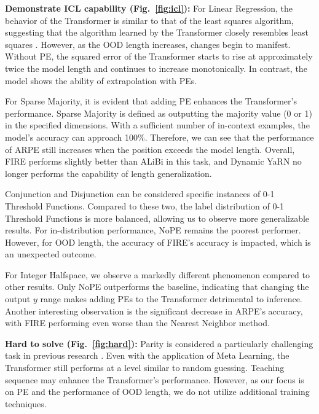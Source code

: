 \documentclass[letterpaper]{article} %
\begin{document}
\textbf{Demonstrate ICL capability (Fig.~\ref{fig:icl}):} For Linear Regression, the behavior of the Transformer is similar to that of the least squares algorithm, suggesting that the algorithm learned by the Transformer closely resembles least squares \cite{akyurek-2023-what}. However, as the OOD length increases, changes begin to manifest. Without PE, the squared error of the Transformer starts to rise at approximately twice the model length and continues to increase monotonically. In contrast, the model shows the ability of extrapolation with PEs.

For Sparse Majority, it is evident that adding PE enhances the Transformer's performance. Sparse Majority is defined as outputting the majority value (0 or 1) in the specified dimensions. With a sufficient number of in-context examples, the model's accuracy can approach 100\%. Therefore, we can see that the performance of ARPE still increases when the position exceeds the model length. Overall, FIRE performs slightly better than ALiBi in this task, and Dynamic YaRN no longer performs the capability of length generalization.

Conjunction and Disjunction can be considered specific instances of 0-1 Threshold Functions. Compared to these two, the label distribution of 0-1 Threshold Functions is more balanced, allowing us to observe more generalizable results. For in-distribution performance, NoPE remains the poorest performer. However, for OOD length, the accuracy of  FIRE's accuracy is impacted, which is an unexpected outcome.

For Integer Halfspace, we observe a markedly different phenomenon compared to other results. Only NoPE outperforms the baseline, indicating that changing the output $y$ range makes adding PEs to the Transformer detrimental to inference. Another interesting observation is the significant decrease in ARPE's accuracy, with FIRE performing even worse than the Nearest Neighbor method.

\textbf{Hard to solve (Fig.~\ref{fig:hard}):} Parity is considered a particularly challenging task in previous research \cite{anil-2022-exploring, zhou-2024-what}. Even with the application of Meta Learning, the Transformer still performs at a level similar to random guessing. Teaching sequence \cite{bhattamishra-2024-understanding} may enhance the Transformer's performance. However, as our focus is on PE and the performance of OOD length, we do not utilize additional training techniques.
\end{document}
